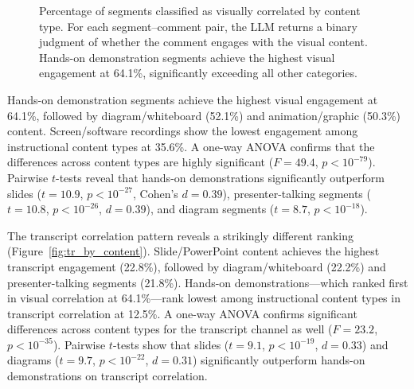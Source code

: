\documentclass[fleqn,10pt]{wlscirep}
\begin{document}
\begin{figure}[ht]
    \centering
    \caption{Percentage of segments classified as visually correlated by content type. For each segment--comment pair, the LLM returns a binary judgment of whether the comment engages with the visual content. Hands-on demonstration segments achieve the highest visual engagement at 64.1\%, significantly exceeding all other categories.}
    \label{fig:vis_by_content}
\end{figure}

Hands-on demonstration segments achieve the highest visual engagement at 64.1\%, followed by diagram/whiteboard (52.1\%) and animation/graphic (50.3\%) content. Screen/software recordings show the lowest engagement among instructional content types at 35.6\%. A one-way ANOVA confirms that the differences across content types are highly significant ($F = 49.4$, $p < 10^{-79}$). Pairwise $t$-tests reveal that hands-on demonstrations significantly outperform slides ($t = 10.9$, $p < 10^{-27}$, Cohen's $d = 0.39$), presenter-talking segments ($t = 10.8$, $p < 10^{-26}$, $d = 0.39$), and diagram segments ($t = 8.7$, $p < 10^{-18}$).

The transcript correlation pattern reveals a strikingly different ranking (Figure~\ref{fig:tr_by_content}). Slide/PowerPoint content achieves the highest transcript engagement (22.8\%), followed by diagram/whiteboard (22.2\%) and presenter-talking segments (21.8\%). Hands-on demonstrations---which ranked first in visual correlation at 64.1\%---rank lowest among instructional content types in transcript correlation at 12.5\%. A one-way ANOVA confirms significant differences across content types for the transcript channel as well ($F = 23.2$, $p < 10^{-35}$). Pairwise $t$-tests show that slides ($t = 9.1$, $p < 10^{-19}$, $d = 0.33$) and diagrams ($t = 9.7$, $p < 10^{-22}$, $d = 0.31$) significantly outperform hands-on demonstrations on transcript correlation.
\end{document}
